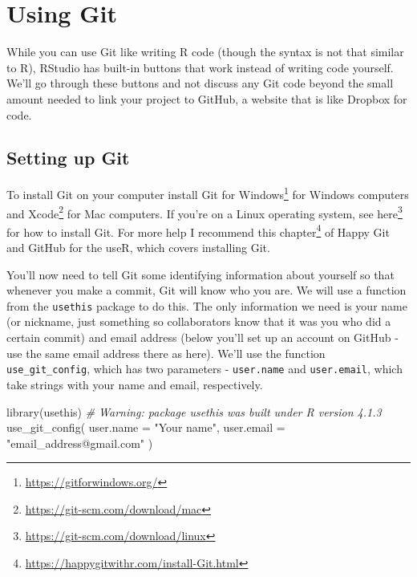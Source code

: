 \documentclass[
  a4paper,
]{krantz}
\makeatletter
\newenvironment{Shaded}{\begin{snugshade}}{\end{snugshade}}
\newcommand{\AttributeTok}[1]{\textcolor[rgb]{0.77,0.63,0.00}{#1}}
\newcommand{\CommentTok}[1]{\textcolor[rgb]{0.56,0.35,0.01}{\textit{#1}}}
\newcommand{\FunctionTok}[1]{\textcolor[rgb]{0.00,0.00,0.00}{#1}}
\newcommand{\NormalTok}[1]{#1}
\newcommand{\StringTok}[1]{\textcolor[rgb]{0.31,0.60,0.02}{#1}}
\renewcommand{\href}[2]{#2\footnote{\url{#1}}}
\newenvironment{kframe}{%
\medskip{}
\setlength{\fboxsep}{.8em}
 \def\at@end@of@kframe{}%
 \ifinner\ifhmode%
  \def\at@end@of@kframe{\end{minipage}}%
  \begin{minipage}{\columnwidth}%
 \fi\fi%
 \def\FrameCommand##1{\hskip\@totalleftmargin \hskip-\fboxsep
 \colorbox{shadecolor}{##1}\hskip-\fboxsep
     \hskip-\linewidth \hskip-\@totalleftmargin \hskip\columnwidth}%
 \MakeFramed {\advance\hsize-\width
   \@totalleftmargin\z@ \linewidth\hsize
   \@setminipage}}%
 {\par\unskip\endMakeFramed%
 \at@end@of@kframe}
\renewenvironment{Shaded}{\begin{kframe}}{\end{kframe}}
\makeatother
\begin{document}
\hypertarget{using-git}{%
\section{Using Git}\label{using-git}}

While you can use Git like writing R code (though the syntax
is not that similar to R), RStudio has built-in buttons that
work instead of writing code yourself. We'll go through
these buttons and not discuss any Git code beyond the small
amount needed to link your project to GitHub, a website that
is like Dropbox for code.

\hypertarget{setting-up-git}{%
\subsection{Setting up Git}\label{setting-up-git}}

To install Git on your computer install
\href{https://gitforwindows.org/}{Git for Windows} for
Windows computers and
\href{https://git-scm.com/download/mac}{Xcode} for Mac
computers. If you're on a Linux operating system, see
\href{https://git-scm.com/download/linux}{here} for how to
install Git. For more help I recommend
\href{https://happygitwithr.com/install-Git.html}{this
chapter} of Happy Git and GitHub for the useR, which covers
installing Git.

You'll now need to tell Git some identifying information
about yourself so that whenever you make a commit, Git will
know who you are. We will use a function from the
\texttt{usethis} package to do this. The only information we
need is your name (or nickname, just something so
collaborators know that it was you who did a certain commit)
and email address (below you'll set up an account on GitHub
- use the same email address there as here). We'll use the
function \texttt{use\_git\_config}, which has two parameters
- \texttt{user.name} and \texttt{user.email}, which take
strings with your name and email, respectively.

\begin{Shaded}
\begin{Highlighting}[]
\FunctionTok{library}\NormalTok{(usethis)}
\CommentTok{\# Warning: package \textquotesingle{}usethis\textquotesingle{} was built under R version 4.1.3}
\FunctionTok{use\_git\_config}\NormalTok{(}
  \AttributeTok{user.name =} \StringTok{"Your name"}\NormalTok{,}
  \AttributeTok{user.email =} \StringTok{"email\_address@gmail.com"}
\NormalTok{)}
\end{Highlighting}
\end{Shaded}
\end{document}
